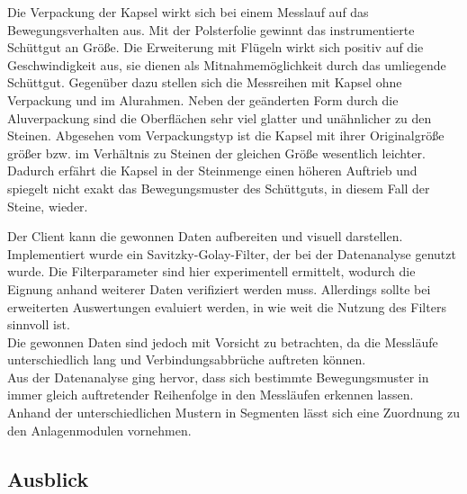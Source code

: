 Die Verpackung der Kapsel wirkt sich bei einem Messlauf auf das Bewegungsverhalten aus. Mit der Polsterfolie gewinnt das instrumentierte Schüttgut an Größe. Die Erweiterung mit Flügeln wirkt sich positiv auf die Geschwindigkeit aus, sie dienen als Mitnahmemöglichkeit durch das umliegende Schüttgut. Gegenüber dazu stellen sich die Messreihen mit Kapsel ohne Verpackung und im Alurahmen. Neben der geänderten Form durch die Aluverpackung sind die Oberflächen sehr viel glatter und unähnlicher zu den Steinen. 
Abgesehen vom Verpackungstyp ist die Kapsel mit ihrer Originalgröße größer bzw. im Verhältnis zu Steinen der gleichen Größe wesentlich leichter. Dadurch erfährt die Kapsel in der Steinmenge einen höheren Auftrieb und spiegelt nicht exakt das Bewegungsmuster des Schüttguts, in diesem Fall der Steine, wieder. 

Der Client kann die gewonnen Daten aufbereiten und visuell darstellen. Implementiert wurde ein Savitzky-Golay-Filter, der bei der Datenanalyse genutzt wurde. Die Filterparameter sind hier experimentell ermittelt, wodurch die Eignung anhand weiterer Daten verifiziert werden muss. Allerdings sollte bei erweiterten Auswertungen evaluiert werden, in wie weit die Nutzung des Filters sinnvoll ist. \\
Die gewonnen Daten sind jedoch mit Vorsicht zu betrachten, da die Messläufe unterschiedlich lang und Verbindungsabbrüche auftreten können. \\
Aus der Datenanalyse ging hervor, dass sich bestimmte Bewegungsmuster in immer gleich auftretender Reihenfolge in den Messläufen erkennen lassen. Anhand der unterschiedlichen Mustern in Segmenten lässt sich eine Zuordnung zu den Anlagenmodulen vornehmen. 

\subsection{Ausblick}

